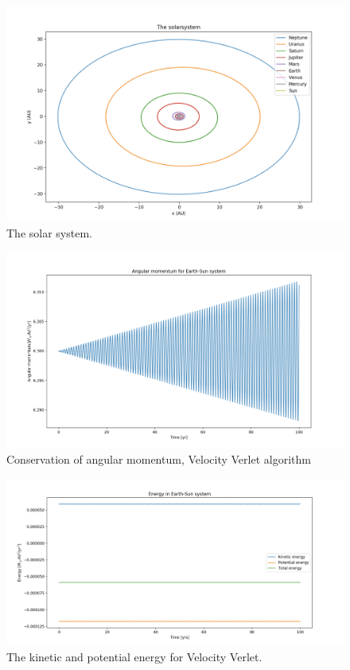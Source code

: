 \documentclass{article}
\begin{document}
\begin{figure}[H]
	\centering
	\includegraphics[width=120mm]{Solar}
	\caption{The solar system.}
	\label{fig:Solar}
\end{figure}

\begin{figure}[H]
	\centering
	\includegraphics[width=120mm]{ang_mom_con.png}
	\caption{Conservation of angular momentum, Velocity Verlet algorithm  }
	\label{fig:angmon}
\end{figure}

\begin{figure}[H]
	\centering
	\includegraphics[width=120mm]{Energy}
	\caption{The kinetic and potential energy for Velocity Verlet.}
	\label{fig:Energy}
\end{figure}
\end{document}
